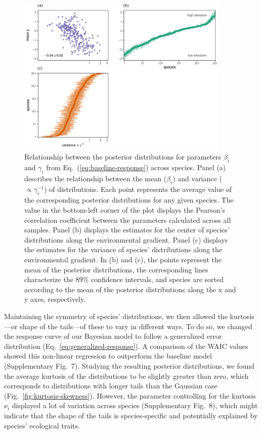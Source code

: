 \documentclass[11pt, a4paper]{article}
\begin{document}
\begin{figure}[ht]
  \centering
    \includegraphics[width=0.9\textwidth]{figures/figure1-prime}
    	  \vspace{0.1cm}
	   \caption{Relationship between the posterior distributions for parameters $\beta_i$ and $\gamma_i$ from Eq.~(\ref{eq:baseline-response}) across species. Panel (a) describes the relationship between the mean ($\beta_i$) and variance ($\propto\gamma_i^{-1}$) of distributions. Each point represents the average value of the corresponding posterior distributions for any given species. The value in the bottom-left corner of the plot displays the Pearson's correlation coefficient between the parameters calculated across all samples. Panel (b) displays the estimates for the center of species' distributions along the environmental gradient. Panel (c) displays the estimates for the variance of species' distributions along the environmental gradient. In (b) and (c), the points represent the mean of the posterior distributions, the corresponding lines characterize the 89\% confidence intervals, and species are sorted according to the mean of the posterior distributions along the x and y axes, respectively.}
      \label{fig:correlation}
\end{figure}

Maintaining the symmetry of species' distributions, we then allowed the kurtosis---or shape of the tails---of these to vary in different ways. To do so, we changed the response curve of our Bayesian model to follow a generalized error distribution (Eq.~\ref{eq:generalized-response}). A comparison of the WAIC values showed this non-linear regression to outperform the baseline model (Supplementary Fig.~7). Studying the resulting posterior distributions, we found the average kurtosis of the distributions to be slightly greater than zero, which corresponds to distributions with longer tails than the Gaussian case (Fig.~\ref{fig:kurtosis-skewness}). However, the parameter controlling for the kurtosis $\nu_i$ displayed a lot of variation across species (Supplementary Fig.~8), which might indicate that the shape of the tails is species-specific and potentially explained by species' ecological traits. 
\end{document}
